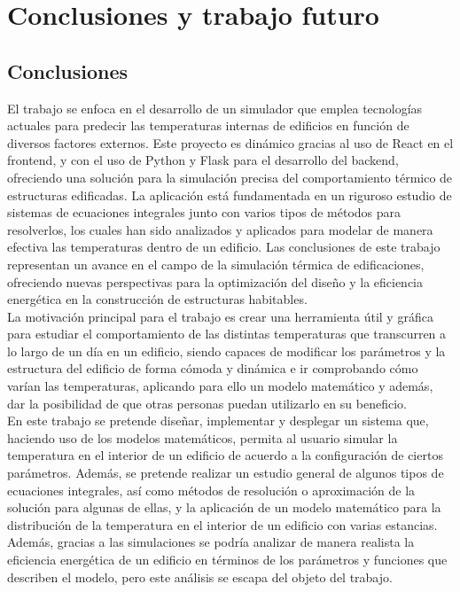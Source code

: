 \chapter{Conclusiones y trabajo futuro}
\section{Conclusiones}
El trabajo se enfoca en el desarrollo de un simulador que emplea tecnologías actuales para predecir las temperaturas internas de edificios en función de diversos factores externos. Este proyecto es dinámico gracias al uso de React en el frontend, y con el uso de Python y Flask para el desarrollo del backend, ofreciendo una solución para la simulación precisa del comportamiento térmico de estructuras edificadas. La aplicación está fundamentada en un riguroso estudio de sistemas de ecuaciones integrales junto con varios tipos de métodos para resolverlos, los cuales han sido analizados y aplicados para modelar de manera efectiva las temperaturas dentro de un edificio. Las conclusiones de este trabajo representan un avance en el campo de la simulación térmica de edificaciones, ofreciendo nuevas perspectivas para la optimización del diseño y la eficiencia energética en la construcción de estructuras habitables.\\

La motivación principal para el trabajo es crear una herramienta útil y gráfica para estudiar el comportamiento de las distintas temperaturas que transcurren a lo largo de un día en un edificio, siendo capaces de modificar los parámetros y la estructura del edificio de forma cómoda y dinámica e ir comprobando cómo varían las temperaturas,  aplicando para ello un modelo matemático y además, dar la posibilidad de que otras personas puedan utilizarlo en su beneficio.\\

En este trabajo se pretende diseñar, implementar y desplegar un sistema que, haciendo uso de los modelos matemáticos, permita al usuario simular la temperatura en el interior de un edificio de acuerdo a la configuración de ciertos parámetros. Además, se pretende realizar un estudio general de algunos tipos de ecuaciones integrales, así como métodos de resolución o aproximación de la solución para algunas de ellas, y la aplicación de un modelo matemático para la distribución de la temperatura en el interior de un edificio con varias estancias. Además, gracias a las simulaciones se podría analizar de manera realista la eficiencia energética de un edificio en términos de los parámetros y funciones que describen el modelo, pero este análisis se escapa del objeto del trabajo.\\

